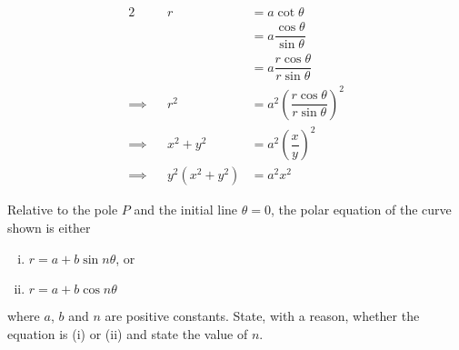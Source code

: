 \documentclass{echw}
\begin{document}
            \begin{alignat*}{2}
                &&r &= a\cot\theta\\
                && &= a\dfrac{\cos\theta}{\sin\theta}\\
                && &= a\dfrac{r\cos\theta}{r\sin\theta}\\
                \implies&&r^2 &= a^2\left(\dfrac{r\cos\theta}{r\sin\theta}\right)^2\\
                \implies&&x^2 + y^2 &= a^2\left(\dfrac{x}{y}\right)^2\\
                \implies&&y^2(x^2 + y^2) &= a^2x^2
            \end{alignat*}


    \problem{}
        \begin{center}
        \end{center}
        \noindent Relative to the pole $P$ and the initial line $\theta = 0$, the polar equation of the curve shown is either
        
        \begin{enumerate}[i.]
            \item $r = a+b\sin n\theta$, or
            \item $r = a + b\cos n \theta$
        \end{enumerate}
        \noindent where $a$, $b$ and $n$ are positive constants. State, with a reason, whether the equation is (i) or (ii) and state the value of $n$.
\end{document}
